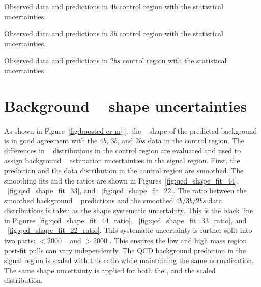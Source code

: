 \begin{table}[htb!]
\begin{center}
\caption{Observed data and predictions in $4b$ control region with the statistical uncertainties.}

\label{tab:Tab_4b_CR_Variations}
\end{center}
\end{table}

\begin{table}[htb!]
\begin{center}
\caption{Observed data and predictions in $3b$ control region with the statistical uncertainties.}

\label{tab:Tab_3b_CR_Variations}
\end{center}
\end{table}

\begin{table}[htb!]
\begin{center}
\caption{Observed data and predictions in $2bs$ control region with the statistical uncertainties.}

\label{tab:Tab_2bs_CR_Variations}
\end{center}
\end{table}

\section{Background \mtwoJ~ shape uncertainties}
\label{sec:unc-shape-qcd-in-sr}
\paragraph{}
As shown in Figure~\ref{fig:boosted-cr-mjj}, the \mtwoJ~ shape of the predicted background is in good agreement with the $4b$, $3b$, and $2bs$ data in the control region.
The differences in \mtwoJ~ distributions in the control region are evaluated and used to assign background \mtwoJ~ estimation uncertainties in the signal region. 
First, the prediction and the data distribution in the control region are smoothed.
The smoothing fits and the ratios are shown in Figures~\ref{fig:qcd_shape_fit_44}, ~\ref{fig:qcd_shape_fit_33}, and ~\ref{fig:qcd_shape_fit_22}.
The ratio between the smoothed background \mtwoJ~ predictions and the smoothed $4b/3b/2bs$ data \mtwoJ~ distributions is taken as the shape systematic uncertainty.
This is the black line in Figures~\ref{fig:qcd_shape_fit_44_ratio}, ~\ref{fig:qcd_shape_fit_33_ratio}, and ~\ref{fig:qcd_shape_fit_22_ratio}.
This systematic uncertainty is further split into two parts: \mtwoJ $< 2000$ \GeV~ and \mtwoJ $> 2000$ \GeV.
This ensures the low and high mass region post-fit pulls can vary independently.
The QCD background prediction in the signal region is scaled with this ratio while maintaining the same normalization.
The same shape uncertainty is applied for both the \mtwoJ, and the scaled \mtwoJ~ distribution. 


